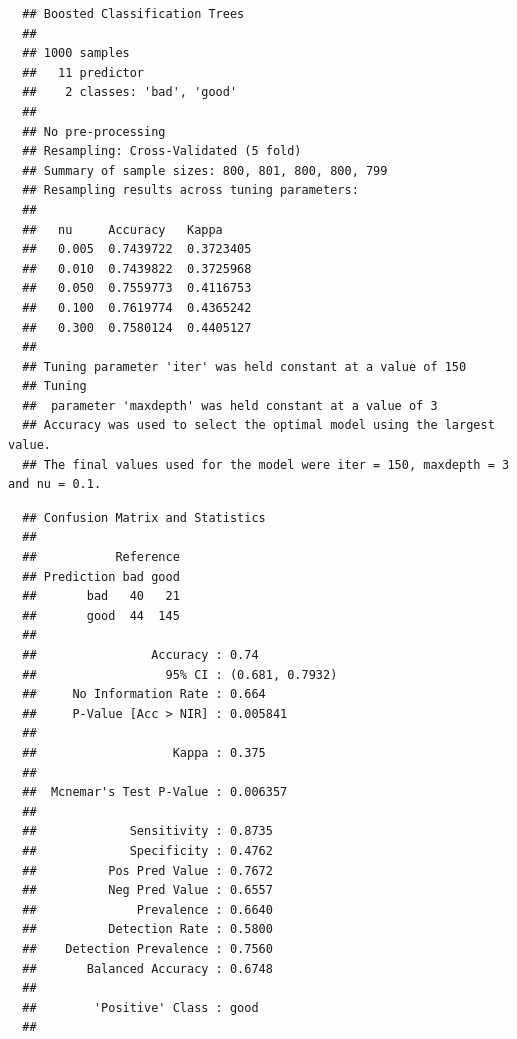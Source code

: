 \documentclass[
]{book}
\newenvironment{Shaded}{\begin{snugshade}}{\end{snugshade}}
\newcommand{\AttributeTok}[1]{\textcolor[rgb]{0.77,0.63,0.00}{#1}}
\newcommand{\FunctionTok}[1]{\textcolor[rgb]{0.00,0.00,0.00}{#1}}
\newcommand{\NormalTok}[1]{#1}
\newcommand{\SpecialCharTok}[1]{\textcolor[rgb]{0.00,0.00,0.00}{#1}}
\newcommand{\StringTok}[1]{\textcolor[rgb]{0.31,0.60,0.02}{#1}}
\theoremstyle{break}
\theoremstyle{nonumberplain}
\begin{document}
\begin{verbatim}
  ## Boosted Classification Trees 
  ## 
  ## 1000 samples
  ##   11 predictor
  ##    2 classes: 'bad', 'good' 
  ## 
  ## No pre-processing
  ## Resampling: Cross-Validated (5 fold) 
  ## Summary of sample sizes: 800, 801, 800, 800, 799 
  ## Resampling results across tuning parameters:
  ## 
  ##   nu     Accuracy   Kappa    
  ##   0.005  0.7439722  0.3723405
  ##   0.010  0.7439822  0.3725968
  ##   0.050  0.7559773  0.4116753
  ##   0.100  0.7619774  0.4365242
  ##   0.300  0.7580124  0.4405127
  ## 
  ## Tuning parameter 'iter' was held constant at a value of 150
  ## Tuning
  ##  parameter 'maxdepth' was held constant at a value of 3
  ## Accuracy was used to select the optimal model using the largest value.
  ## The final values used for the model were iter = 150, maxdepth = 3 and nu = 0.1.
\end{verbatim}

\begin{Shaded}
\end{Shaded}

\begin{verbatim}
  ## Confusion Matrix and Statistics
  ## 
  ##           Reference
  ## Prediction bad good
  ##       bad   40   21
  ##       good  44  145
  ##                                          
  ##                Accuracy : 0.74           
  ##                  95% CI : (0.681, 0.7932)
  ##     No Information Rate : 0.664          
  ##     P-Value [Acc > NIR] : 0.005841       
  ##                                          
  ##                   Kappa : 0.375          
  ##                                          
  ##  Mcnemar's Test P-Value : 0.006357       
  ##                                          
  ##             Sensitivity : 0.8735         
  ##             Specificity : 0.4762         
  ##          Pos Pred Value : 0.7672         
  ##          Neg Pred Value : 0.6557         
  ##              Prevalence : 0.6640         
  ##          Detection Rate : 0.5800         
  ##    Detection Prevalence : 0.7560         
  ##       Balanced Accuracy : 0.6748         
  ##                                          
  ##        'Positive' Class : good           
  ## 
\end{verbatim}
\end{document}
